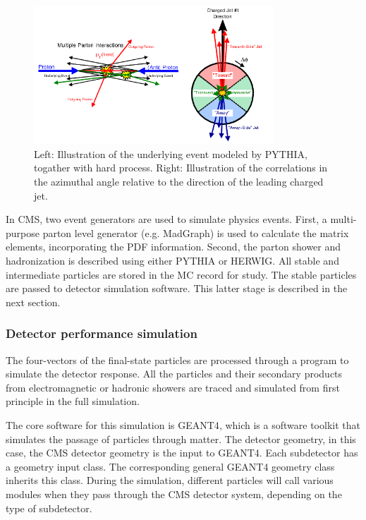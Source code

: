 \begin{figure}[htbp]
 \begin{center}
  \includegraphics[width=0.8\textwidth]{figures/c3/c3_cms_underlyingevents.png}
 \end{center}
 \caption{Left: Illustration of the underlying event modeled by PYTHIA, togather with hard process. Right: Illustration of the correlations in the azimuthal angle relative to the direction of the leading charged jet.}
 \label{fig:c3cmsunderlyingevents}
\end{figure}

In CMS, two event generators are used to simulate physics events. First, a multi-purpose parton level generator (e.g. MadGraph\cite{Alwall:2011uj}) is used to calculate the matrix elements, incorporating the PDF information. Second, the parton shower and hadronization is described using either PYTHIA\cite{Sjostrand:2014zea} or HERWIG\cite{Bellm:2015jjp}. All stable and intermediate particles are stored in the MC record for study. The stable particles are passed to detector simulation software. This latter stage is described in the next section. 

\subsubsection{Detector performance simulation}

The four-vectors of the final-state particles are processed through a program to simulate the detector response. All the particles and their secondary products from electromagnetic or hadronic showers are traced and simulated from first principle in the full simulation. 

The core software for this simulation is GEANT4\cite{Agostinelli:2002hh}, which is a software toolkit that simulates the passage of particles through matter. The detector geometry, in this case, the CMS detector geometry\cite{Lefebure:1999wja} is the input to GEANT4. Each subdetector has a geometry input class. The corresponding general GEANT4 geometry class inherits this class. During the simulation, different particles will call various modules when they pass through the CMS detector system, depending on the type of subdetector. 

